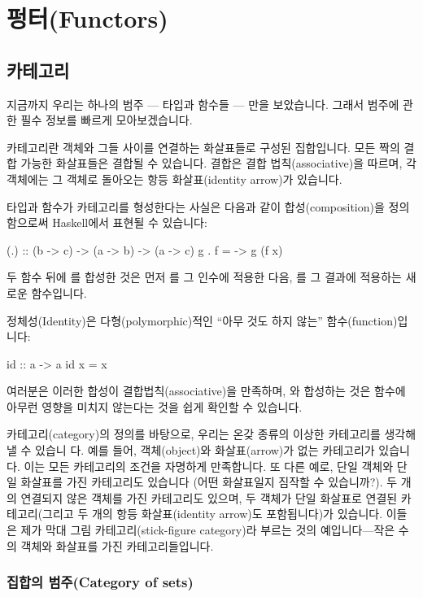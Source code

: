 \documentclass[DaoFP]{subfiles}
\begin{document}
\setcounter{chapter}{7}

\chapter{펑터(Functors)}
\section{카테고리}

지금까지 우리는 하나의 범주 --- 타입과 함수들 --- 만을 보았습니다. 그래서 범주에 관한 필수 정보를 빠르게 모아보겠습니다.

카테고리란 객체와 그들 사이를 연결하는 화살표들로 구성된 집합입니다. 모든 짝의 결합 가능한 화살표들은 결합될 수 있습니다. 결합은 결합 법칙(associative)을 따르며, 각 객체에는 그 객체로 돌아오는 항등 화살표(identity arrow)가 있습니다.

타입과 함수가 카테고리를 형성한다는 사실은 다음과 같이 합성(composition)을 정의함으로써 Haskell에서 표현될 수 있습니다:
\begin{haskell}
(.) :: (b -> c) -> (a -> b) -> (a -> c)
g . f = \x -> g (f x)
\end{haskell}
두 함수  뒤에 를 합성한 것은 먼저 를 그 인수에 적용한 다음, 를 그 결과에 적용하는 새로운 함수입니다.

정체성(Identity)은 다형(polymorphic)적인 ``아무 것도 하지 않는'' 함수(function)입니다:
\begin{haskell}
id :: a -> a
id x = x
\end{haskell}
여러분은 이러한 합성이 결합법칙(associative)을 만족하며, 와 합성하는 것은 함수에 아무런 영향을 미치지 않는다는 것을 쉽게 확인할 수 있습니다.

카테고리(category)의 정의를 바탕으로, 우리는 온갖 종류의 이상한 카테고리를 생각해낼 수 있습니 다. 예를 들어, 객체(object)와 화살표(arrow)가 없는 카테고리가 있습니다. 이는 모든 카테고리의 조건을 자명하게 만족합니다. 또 다른 예로, 단일 객체와 단일 화살표를 가진 카테고리도 있습니다 (어떤 화살표일지 짐작할 수 있습니까?). 두 개의 연결되지 않은 객체를 가진 카테고리도 있으며, 두 객체가 단일 화살표로 연결된 카테고리(그리고 두 개의 항등 화살표(identity arrow)도 포함됩니다)가 있습니다. 이들은 제가 막대 그림 카테고리(stick-figure category)라 부르는 것의 예입니다---작은 수의 객체와 화살표를 가진 카테고리들입니다.
\subsection{집합의 범주(Category of sets)}
\end{document}
